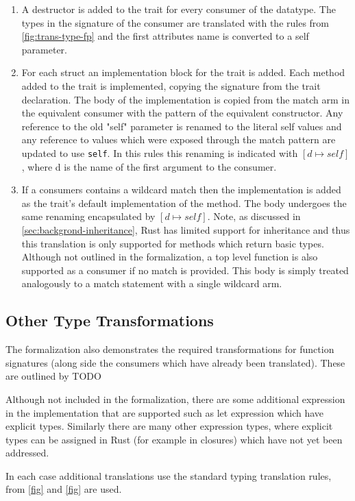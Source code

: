 \documentclass[ oneside,%
                    author={James Elgar},
                    degree={MEng},
                     title={Bidirectional transformer between functional and \\ object-oriented programming in Rust},
                  subtitle={}]{dissertation}
\begin{document}
\begin{enumerate}
    \item A destructor is added to the trait for every consumer of the datatype. The types in the signature of the consumer are translated with the rules from \autoref{fig:trans-type-fp} and the first attributes name is converted to a self parameter.
    \item For each struct an implementation block for the trait is added. Each method added to the trait is implemented, copying the signature from the trait declaration. The body of the implementation is copied from the match arm in the equivalent consumer with the pattern of the equivalent constructor. Any reference to the old "self" parameter is renamed to the literal self values and any reference to values which were exposed through the match pattern are updated to use \verb|self|. In this rules this renaming is indicated with $[d \mapsto self]$, where d is the name of the first argument to the consumer.
    \item If a consumers contains a wildcard match then the implementation is added as the trait's default implementation of the method. The body undergoes the same renaming encapsulated by $[d \mapsto self]$. Note, as discussed in \autoref{sec:backgrond-inheritance}, Rust has limited support for inheritance and thus this translation is only supported for methods which return basic types. Although not outlined in the formalization, a top level function is also supported as a consumer if no match is provided. This body is simply treated analogously to a match statement with a single wildcard arm.
\end{enumerate}

\subsection{Other Type Transformations}

The formalization also demonstrates the required transformations for function signatures (along side the consumers which have already been translated). These are outlined by TODO

Although not included in the formalization, there are some additional expression in the implementation that are supported such as let expression which have explicit types. 
Similarly there are many other expression types, where explicit types can be assigned in Rust (for example in closures) which have not yet been addressed.

In each case additional translations use the standard typing translation rules, from \autoref{fig} and \autoref{fig} are used.
\end{document}
